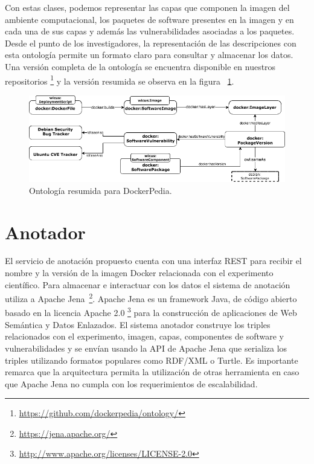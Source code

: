 Con estas clases, podemos representar las capas que componen la imagen del ambiente computacional, los paquetes de software presentes en la imagen y en cada una de sus capas y además las vulnerabilidades asociadas a los paquetes.
Desde el punto de los investigadores, la representación de las descripciones con esta ontología permite un formato claro para consultar y almacenar los datos.
Una versión completa de la ontología se encuentra disponible en nuestros repositorios \footnote{\url{https://github.com/dockerpedia/ontology/}} y la versión resumida se observa en la figura ~\ref{fig:ontology}. 

\begin{figure}[t]
  \centering
    \includegraphics[width=1\textwidth]{Figures/dockerOntologyBasic.png}
      \caption{Ontología resumida para DockerPedia.}
     \label{fig:ontology}

\end{figure}

\section{Anotador}\label{s4.2}

El servicio de anotación propuesto cuenta con una interfaz REST para recibir el nombre y la versión de la imagen Docker relacionada con el experimento científico. 
Para almacenar e interactuar con los datos el sistema de anotación utiliza a Apache Jena~\footnote{\url{https://jena.apache.org/}}. Apache Jena es un framework Java, de código abierto basado en la licencia Apache 2.0 \footnote{\url{http://www.apache.org/licenses/LICENSE-2.0}} para la construcción de aplicaciones de Web Semántica y Datos Enlazados. El sistema anotador construye los triples relacionados con el experimento, imagen, capas, componentes de software y vulnerabilidades y se envían usando la API de Apache Jena que serializa los triples utilizando formatos populares como RDF/XML o Turtle.
Es importante remarca que la arquitectura permita la utilización de otras herramienta en caso que Apache Jena no cumpla con los requerimientos de escalabilidad.

